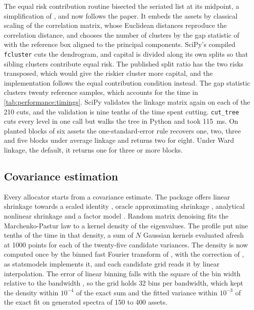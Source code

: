 The equal risk contribution routine bisected the seriated list at its
midpoint, a simplification of \citet{raffinot_hierarchical_2018}, and now
follows the paper. It embeds the assets by classical scaling of the
correlation matrix, whose Euclidean distances reproduce the correlation
distance, and chooses the number of clusters by the gap statistic of
\citet{tibshirani_estimating_2001} with the reference box aligned to the
principal components. SciPy's compiled \texttt{fcluster} cuts the dendrogram,
and capital is divided along its own splits so that sibling clusters
contribute equal risk. The published split ratio has the two risks
transposed, which would give the riskier cluster more capital, and the
implementation follows the equal contribution condition instead. The gap
statistic clusters twenty reference samples, which accounts for the time in
\cref{tab:performance:timings}. SciPy validates the linkage matrix again on
each of the 210 cuts, and the validation is nine tenths of the time spent
cutting. \texttt{cut\_tree} cuts every level in one call but walks the tree
in Python and took 115~ms. On planted blocks of six assets the
one-standard-error rule recovers one, two, three and five blocks under average
linkage and returns two for eight. Under Ward linkage, the default, it returns
one for three or more blocks.

\subsection{Covariance estimation}

Every allocator starts from a covariance estimate. The package offers linear
shrinkage towards a scaled identity
\citep{ledoit_honey_2004,ledoit_wellconditioned_2004}, oracle approximating
shrinkage \citep{chen_shrinkage_2010}, analytical nonlinear shrinkage
\citep{ledoit_nonlinear_2012,ledoit_analytical_2020} and a factor model
\citep{fama_common_1993,fan_large_2013}. Random matrix denoising
\citep{laloux_noise_1999,plerou_universal_1999,laloux_random_2000,bouchaud_theory_2003,lopezdeprado_machine_2020}
fits the Marchenko-Pastur law \citep{marchenko_distribution_1967} to a kernel
density of the eigenvalues. The profile put nine tenths of the time in that
density, a sum of $N$ Gaussian kernels evaluated afresh at 1000 points for each
of the twenty-five candidate variances. The density is now computed once by the
binned fast Fourier transform of \citet{silverman_algorithm_1982}, with the
correction of \citet{jones_remark_1984}, as statsmodels implements it, and
each candidate grid reads it by linear interpolation. The error of linear
binning falls with the square of the bin width relative to the bandwidth
\citep{hall_accuracy_1996}, so the grid holds 32 bins per bandwidth, which
kept the density within $10^{-4}$ of the exact sum and the fitted variance
within $10^{-3}$ of the exact fit on generated spectra of 150 to 400 assets.

